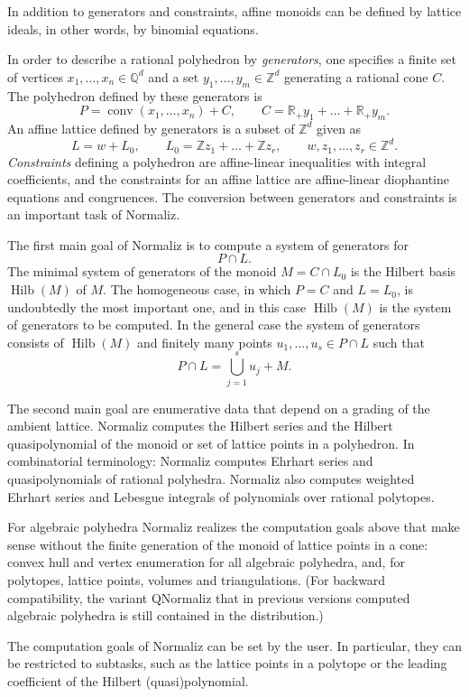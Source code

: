 \documentclass[12pt,a4paper]{scrartcl}
\theoremstyle{definition}
\def\ZZ{{\mathbb Z}}
\def\QQ{{\mathbb Q}}
\def\RR{{\mathbb R}}
\DeclareMathOperator{\conv}{conv}
\DeclareMathOperator{\Hilb}{Hilb}
\begin{document}
In addition to generators and constraints, affine monoids can be defined by lattice ideals, in other words, by binomial equations.

In order to describe a rational polyhedron by \emph{generators}, one specifies a finite set of vertices $x_1,\dots,x_n\in\QQ^d$ and a set $y_1,\dots,y_m\in\ZZ^d$ generating a rational cone $C$. The polyhedron defined by these generators is 
$$
P=\conv(x_1,\dots,x_n)+C,\qquad C=\RR_+y_1+\dots+\RR_+y_m.
$$
An affine lattice defined by generators is a subset of $\ZZ^d$ given as
$$
L=w+L_0,\qquad L_0=\ZZ z_1+\dots+\ZZ z_r, \qquad w,z_1,\dots,z_r\in \ZZ^d.
$$
\emph{Constraints} defining a polyhedron are affine-linear inequalities with integral coefficients, and the constraints for an affine lattice are affine-linear diophantine equations and congruences. The conversion between generators and constraints is an important task of Normaliz.


The first main goal of Normaliz is to compute a system of generators for
$$
P\cap L.
$$
The minimal system of generators of the monoid $M=C\cap L_0$ is the Hilbert basis $\Hilb(M)$ of $M$. The homogeneous case, in which $P=C$ and $L=L_0$, is undoubtedly the most important one, and in this case $\Hilb(M)$ is the system of generators to be computed. In the general case the system of generators consists of $\Hilb(M)$ and finitely many points $u_1,\dots,u_s\in P\cap L$ such that
$$
P\cap L=\bigcup_{j=1}^s u_j+M.
$$

The second main goal are enumerative data that depend on a grading
of the ambient lattice. Normaliz computes the Hilbert series and
the Hilbert quasipolynomial of the monoid or set of lattice points in a polyhedron. In combinatorial terminology: Normaliz computes Ehrhart series and quasipolynomials of rational polyhedra. Normaliz also computes weighted
Ehrhart series and Lebesgue integrals of polynomials over
rational polytopes.

For algebraic polyhedra Normaliz realizes the computation goals above that make sense without the finite generation of the monoid of lattice points in a cone: convex hull and vertex enumeration for all algebraic polyhedra, and, for polytopes, lattice points, volumes and triangulations. (For backward compatibility, the variant QNormaliz that in previous versions computed algebraic polyhedra is still contained in the distribution.)

The computation goals of Normaliz can be set by the user. In particular, they can be restricted to subtasks, such as the lattice points in a polytope or the leading coefficient of the Hilbert (quasi)polynomial.
\end{document}
